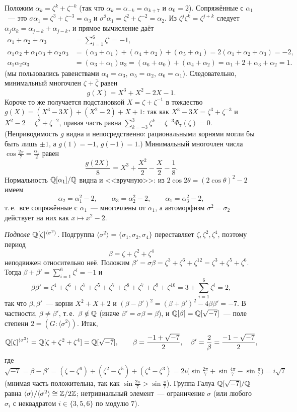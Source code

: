 \begin{example}[3.22]
Положим $\alpha_k=\zeta^k+\zeta^{-k}$ (так что $\alpha_k=\alpha_{-k}=\alpha_{k+7}$ и $\alpha_0=2$). Сопряжённые с $\alpha_1$~--- это
$\sigma\alpha_1=\zeta^3+\zeta^{-3}=\alpha_3$ и $\sigma^2\alpha_1=\zeta^2+\zeta^{-2}=\alpha_2$. Из $\zeta^j\zeta^k=\zeta^{j+k}$ следует
$\alpha_j\alpha_k=\alpha_{j+k}+\alpha_{j-k}$, и прямое вычисление даёт
\begin{align*}
\alpha_1+\alpha_2+\alpha_3&=\textstyle\sum_{i=1}^6\zeta^i=-1,\\
\alpha_1\alpha_2+\alpha_1\alpha_3+\alpha_2\alpha_3&=(\alpha_3+\alpha_1)+(\alpha_4+\alpha_2)+(\alpha_5+\alpha_1)=2(\alpha_1+\alpha_2+\alpha_3)=-2,\\
\alpha_1\alpha_2\alpha_3&=(\alpha_3+\alpha_1)\alpha_3=(\alpha_6+\alpha_0)+(\alpha_4+\alpha_2)=\alpha_1+2+\alpha_3+\alpha_2=1 .
\end{align*}
(мы пользовались равенствами $\alpha_4=\alpha_3$, $\alpha_5=\alpha_2$, $\alpha_6=\alpha_1$). Следовательно, минимальный многочлен $\zeta+\bar\zeta$ равен
\[
g(X)=X^3+X^2-2X-1 .
\]
Короче то же получается подстановкой $X=\zeta+\zeta^{-1}$ в тождество $g(X)=(X^3-3X)+(X^2-2)+X+1$: так как
$X^3-3X=\zeta^3+\zeta^{-3}$ и $X^2-2=\zeta^2+\zeta^{-2}$, правая часть равна $\sum_{k=-3}^3\zeta^k=\zeta^{-3}\Phi_7(\zeta)=0$.
(Неприводимость $g$ видна и непосредственно: рациональными корнями могли бы быть лишь $\pm1$, а $g(1)=-1$, $g(-1)=1$.)
Минимальный многочлен числа $\cos\frac{2\pi}7=\frac{\alpha_1}2$ равен
\[
\frac{g(2X)}8=X^3+\frac{X^2}2-\frac X2-\frac18 .
\]
Нормальность $\mathbb Q[\alpha_1]/\mathbb Q$ видна и <<вручную>>: из $2\cos2\theta=(2\cos\theta)^2-2$ имеем
\[
\alpha_2=\alpha_1^2-2,\qquad\alpha_3=\alpha_2^2-2,\qquad\alpha_1=\alpha_3^2-2,
\]
т.\,е.\ все сопряжённые с $\alpha_1$~--- многочлены от $\alpha_1$, а автоморфизм $\sigma^2=\sigma_2$ действует на них как
$x\mapsto x^2-2$.

\emph{Подполе $\mathbb Q[\zeta]^{\langle\sigma^2\rangle}$.} Подгруппа $\langle\sigma^2\rangle=\{\sigma_1,\sigma_2,\sigma_4\}$ переставляет
$\zeta,\zeta^2,\zeta^4$, поэтому период
\[
\beta=\zeta+\zeta^2+\zeta^4
\]
неподвижен относительно неё. Положим $\beta'=\sigma\beta=\zeta^3+\zeta^6+\zeta^{12}=\zeta^3+\zeta^5+\zeta^6$. Тогда
$\beta+\beta'=\sum_{i=1}^6\zeta^i=-1$ и
\[
\beta\beta'=\zeta^4+\zeta^6+\zeta^7+\zeta^5+\zeta^7+\zeta^8+\zeta^7+\zeta^9+\zeta^{10}=3+\textstyle\sum_{i=1}^6\zeta^i=2,
\]
так что $\beta,\beta'$~--- корни $X^2+X+2$ и $(\beta-\beta')^2=(\beta+\beta')^2-4\beta\beta'=-7$. В частности, $\beta\ne\beta'$, т.\,е.\
$\beta\notin\mathbb Q$ (иначе $\beta'=\sigma\beta=\beta$), и $\mathbb Q[\beta]=\mathbb Q[\sqrt{-7}]$~--- поле степени $2=(G:\langle\sigma^2\rangle)$. Итак,
\[
\mathbb Q[\zeta]^{\langle\sigma^2\rangle}=\mathbb Q[\zeta+\zeta^2+\zeta^4]=\mathbb Q[\sqrt{-7}],\qquad\beta=\frac{-1+\sqrt{-7}}2,\quad\beta'=\frac2\beta=\frac{-1-\sqrt{-7}}2,
\]
где $\sqrt{-7}=\beta-\beta'=(\zeta-\zeta^6)+(\zeta^2-\zeta^5)+(\zeta^4-\zeta^3)=2i\bigl(\sin\frac{2\pi}7+\sin\frac{4\pi}7-\sin\frac{\pi}7\bigr)=i\sqrt7$
(мнимая часть положительна, так как $\sin\frac{2\pi}7>\sin\frac\pi7$). Группа Галуа $\mathbb Q[\sqrt{-7}]/\mathbb Q$ равна
$\langle\sigma\rangle/\langle\sigma^2\rangle\cong\mathbb Z/2\mathbb Z$; нетривиальный элемент~--- ограничение $\sigma$ (или любого $\sigma_i$ с
неквадратом $i\in\{3,5,6\}$ по модулю $7$).


\end{example}
